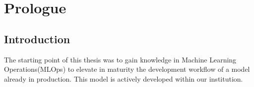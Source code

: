 \chapter{Prologue} %

\section{Introduction}

The starting point of this thesis was to gain knowledge in Machine Learning Operations(MLOps) to
elevate in maturity the development workflow of a model already in production.
This model is actively developed within our institution.


